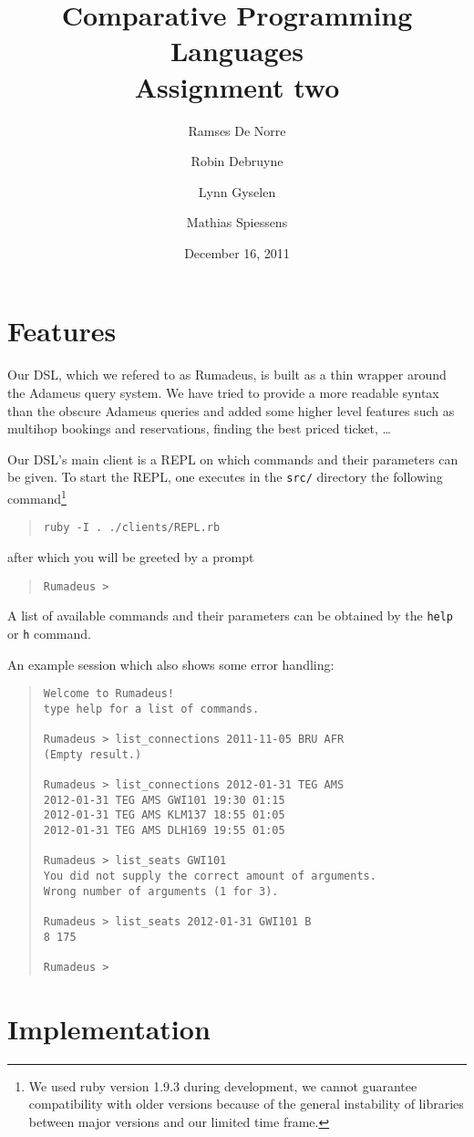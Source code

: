 \documentclass[11pt,pdftex,oneside]{article}
\title{Comparative Programming Languages\\ {\Large Assignment two}}
\author{Ramses De Norre \and Robin Debruyne
        \and Lynn Gyselen \and Mathias Spiessens}
\date{December 16, 2011}
\begin{document}
\maketitle
\thispagestyle{empty}

\section{Features}
Our DSL, which we refered to as Rumadeus, is built as a thin wrapper
around the Adameus query system.
We have tried to provide a more readable syntax than the obscure Adameus
queries and added some higher level features such as multihop bookings and
reservations, finding the best priced ticket, \ldots

Our DSL's main client is a REPL on which commands and their parameters can
be given.
To start the REPL, one executes in the {\tt src/} directory the following
command\footnote{We used ruby version 1.9.3 during development, we cannot
guarantee compatibility with older versions because of the general
instability of libraries between major versions and our limited time
frame.}
\begin{quote}
  {\tt ruby -I . ./clients/REPL.rb}
\end{quote}
after which you will be greeted by a prompt
\begin{quote}
  {\tt Rumadeus >}
\end{quote}

A list of available commands and their parameters can be obtained by the
{\tt help} or {\tt h} command.

An example session which also shows some error handling:
\begin{samepage}
  \begin{quote}
    \begin{verbatim}
Welcome to Rumadeus!
type help for a list of commands.

Rumadeus > list_connections 2011-11-05 BRU AFR
(Empty result.)

Rumadeus > list_connections 2012-01-31 TEG AMS
2012-01-31 TEG AMS GWI101 19:30 01:15
2012-01-31 TEG AMS KLM137 18:55 01:05
2012-01-31 TEG AMS DLH169 19:55 01:05

Rumadeus > list_seats GWI101
You did not supply the correct amount of arguments.
Wrong number of arguments (1 for 3).

Rumadeus > list_seats 2012-01-31 GWI101 B
8 175

Rumadeus >
    \end{verbatim}
  \end{quote}
\end{samepage}

\section{Implementation}
\end{document}
